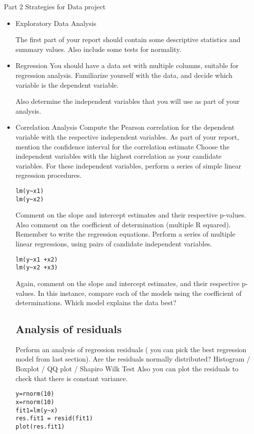 \documentclass[a4paper,12pt]{article}
\begin{document}
Part 2 Strategies for Data project
\begin{itemize}
\item Exploratory Data Analysis

The first part of your report should contain some descriptive statistics and summary values. Also include some tests for normality.

\item{Regression}
You should have a data set with multiple columns, suitable for regression analysis.
Familiarize yourself with the data, and decide which variable is the dependent variable.

Also determine the independent variables that you will use as part of your analysis.

\item{Correlation Analysis}
Compute the Pearson correlation for the dependent variable with the respective independent variables.  As part of your report, mention the confidence interval for the correlation estimate
Choose the independent variables with the highest correlation as your candidate variables.
For these independent variables, perform a series of simple linear regression procedures.
\begin{verbatim}
lm(y~x1)
lm(y~x2)
\end{verbatim}
Comment on the slope and intercept estimates and their respective p-values. Also comment on the coefficient of determination (multiple R squared). Remember to write the regression equations.
Perform a series of multiple linear regressions, using pairs of candidate independent variables.
\begin{verbatim}
lm(y~x1 +x2)
lm(y~x2 +x3)
\end{verbatim}
Again, comment on the slope and intercept estimates, and their respective p-values.
In this instance, compare each of the models using the coefficient of determinations. Which model explains the data best?
\subsection{Analysis of residuals}
Perform an analysis of regression residuals ( you can pick the best regression model from last section).
Are the residuals normally distributed?
	Histogram /  Boxplot / QQ plot / Shapiro Wilk Test
Also you can plot the residuals to check that there is constant variance.
\begin{verbatim}
y=rnorm(10)
x=rnorm(10)
fit1=lm(y~x)
res.fit1 = resid(fit1)
plot(res.fit1)
\end{verbatim}





\end{itemize}
\end{document}
